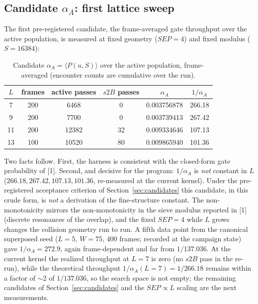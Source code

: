 \documentclass[11pt,a4paper]{article}
\begin{document}
\subsection{Candidate \texorpdfstring{$\alpha_A$}{alphaA}: first lattice sweep}

The first pre-registered candidate, the frame-averaged gate throughput over
the active population, is measured at fixed geometry ($SEP=4$) and fixed
modulus ($S=16384$):
\begin{table}[ht]
\centering
\caption{Candidate $\alpha_A = \langle P(u,S)\rangle$ over the active
population, frame-averaged (encounter counts are cumulative over the run).}
\label{tab:alphaA}
\begin{tabular}{c c c c c c}
\hline
$L$ & frames & active passes & $s2B$ passes & $\alpha_A$ & $1/\alpha_A$ \\
\hline
 7 & 200 & 6468  &  0 & 0.003756878 & 266.18 \\
 9 & 200 & 7700  &  0 & 0.003739413 & 267.42 \\
11 & 200 & 12382 & 32 & 0.009334646 & 107.13 \\
13 & 100 & 10520 & 80 & 0.009865940 & 101.36 \\
\hline
\end{tabular}
\end{table}

Two facts follow. First, the harness is consistent with the closed-form gate
probability of [1]. Second, and decisive for the program: $1/\alpha_A$ is
\emph{not} constant in $L$ ($266.18, 267.42, 107.13, 101.36$, re-measured
at the current kernel). Under the
pre-registered acceptance criterion of Section~\ref{sec:candidates} this
candidate, in this crude form, is \emph{not} a derivation of the
fine-structure constant. The non-monotonicity mirrors the non-monotonicity in
the sieve modulus reported in [1] (discrete resonances of the overlap), and
the fixed $SEP=4$ while $L$ grows changes the collision geometry run to run.
A fifth data point from the canonical superposed seed ($L=5$, $W=75$,
$400$ frames; recorded at the campaign state) gave $1/\alpha_A = 272.9$,
again frame-dependent and far from $1/137.036$.  At the current kernel the
realized throughput at $L=7$ is zero (no $s2B$ pass in the re-run), while
the theoretical throughput $1/\alpha_A(L{=}7) = 1/266.18$ remains within a
factor of $\sim$2 of $1/137.036$, so the search space is not empty; the remaining candidates of
Section~\ref{sec:candidates} and the $SEP\propto L$ scaling are the next
measurements.
\end{document}
